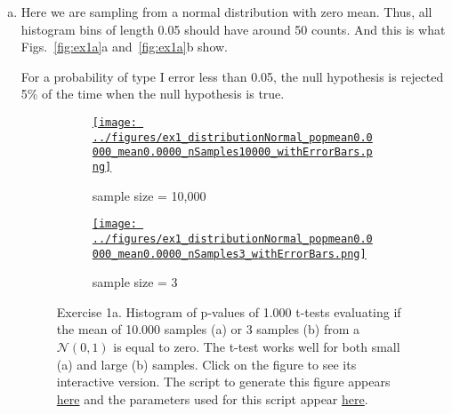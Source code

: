 \documentclass[12pt]{article}
\def\fig_width{3.5in}
\begin{document}
\begin{enumerate}[(a)]

    \item Here we are sampling from a normal distribution with zero mean. Thus,
        all histogram bins of length 0.05 should have around 50 counts. And
        this is what Figs.~\ref{fig:ex1a}a and~\ref{fig:ex1a}b show.

        For a probability of type I error less than 0.05, the null hypothesis
        is rejected 5\% of the time when the null hypothesis is true.

        \begin{figure}[H]
            \begin{center}
                \begin{subfigure}{0.5\textwidth}
                    \centering
                    \href{https://www.gatsby.ucl.ac.uk/~rapela/neuroinformatics/2023/ws1/figures/ex1_distributionNormal_popmean0.0000_mean0.0000_nSamples10000_withErrorBars.html}{\texttt{[image: ../figures/ex1\_distributionNormal\_popmean0.0000\_mean0.0000\_nSamples10000\_withErrorBars.png]}}
                    \caption{sample size = 10,000}
                \end{subfigure}
                \begin{subfigure}{0.5\textwidth}
                    \centering
                    \href{https://www.gatsby.ucl.ac.uk/~rapela/neuroinformatics/2023/ws1/figures/ex1_distributionNormal_popmean0.0000_mean0.0000_nSamples3_withErrorBars.html}{\texttt{[image: ../figures/ex1\_distributionNormal\_popmean0.0000\_mean0.0000\_nSamples3\_withErrorBars.png]}}
                    \caption{sample size = 3}
                \end{subfigure}

                \caption{Exercise 1a. Histogram of p-values of 1.000 t-tests
                evaluating if the mean of 10.000 samples (a) or 3 samples (b)
                from a $\mathcal{N}(0, 1)$ is equal to zero. The t-test works
                well for both small (a) and large (b) samples. Click on the
                figure to see its interactive version.  The script to generate
                this figure appears
                \href{https://github.com/joacorapela/neuroinformatics23/blob/master/worksheets/ws1/mySolution/code/scripts/doEx1WithErrorBars.py}{here}
                and the parameters used for this script appear
                \href{https://github.com/joacorapela/neuroinformatics23/blob/master/worksheets/ws1/mySolution/code/scripts/doEx1aWithErrorBars.csh}{here}.
                }


\end{center}
\end{figure}
\end{enumerate}
\end{document}
